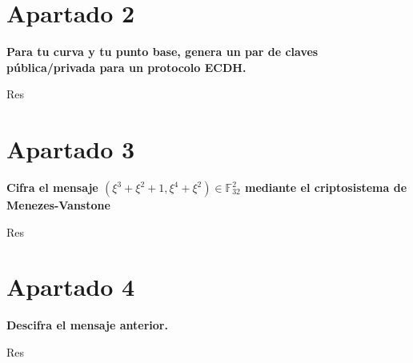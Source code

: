 \documentclass[a4paper]{article}
\begin{document}
\section{Apartado 2}

\textbf{Para  tu  curva  y  tu  punto  base,  genera  un  par  de  claves  pública/privada para un protocolo ECDH.}

Res

\section{Apartado 3}

\textbf{Cifra el mensaje $(\xi^3+\xi^2+1,\xi^4+\xi^2)\in \mathbb{F}^2_{32}$ mediante el criptosistema de Menezes-Vanstone}

Res

\section{Apartado 4}

\textbf{Descifra el mensaje anterior.}

Res
\end{document}
